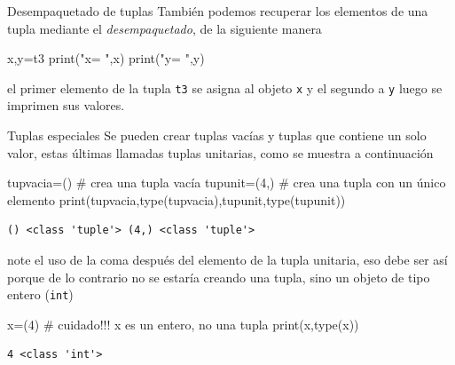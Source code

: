\documentclass[
  ignorenonframetext,
  aspectratio=169,
  spanish,
]{beamer}
\newenvironment{Shaded}{\begin{snugshade}}{\end{snugshade}}
\newcommand{\BuiltInTok}[1]{\textcolor[rgb]{0.00,0.23,0.31}{#1}}
\newcommand{\CommentTok}[1]{\textcolor[rgb]{0.37,0.37,0.37}{#1}}
\newcommand{\DecValTok}[1]{\textcolor[rgb]{0.68,0.00,0.00}{#1}}
\newcommand{\NormalTok}[1]{\textcolor[rgb]{0.00,0.23,0.31}{#1}}
\newcommand{\OperatorTok}[1]{\textcolor[rgb]{0.37,0.37,0.37}{#1}}
\newcommand{\StringTok}[1]{\textcolor[rgb]{0.13,0.47,0.30}{#1}}
\begin{document}
\begin{frame}[fragile]{Desempaquetado de tuplas}
\label{desempaquetado-de-tuplas}
También podemos recuperar los elementos de una tupla mediante el
\emph{desempaquetado}, de la siguiente
manera

\begin{Shaded}
\begin{Highlighting}[]
\NormalTok{x,y}\OperatorTok{=}\NormalTok{t3}
\BuiltInTok{print}\NormalTok{(}\StringTok{"x= "}\NormalTok{,x)}
\BuiltInTok{print}\NormalTok{(}\StringTok{"y= "}\NormalTok{,y)}
\end{Highlighting}
\end{Shaded}

el primer elemento de la tupla \texttt{t3} se asigna al objeto
\texttt{x} y el segundo a \texttt{y} luego se imprimen sus valores.
\end{frame}

\begin{frame}[fragile]{Tuplas especiales}
\label{tuplas-especiales}
Se pueden crear tuplas vacías y tuplas que contiene un solo valor, estas
últimas llamadas tuplas unitarias, como se muestra a continuación

\begin{Shaded}
\begin{Highlighting}[]
\NormalTok{tupvacia}\OperatorTok{=}\NormalTok{() }\CommentTok{\# crea una tupla vacía }
\NormalTok{tupunit}\OperatorTok{=}\NormalTok{(}\DecValTok{4}\NormalTok{,) }\CommentTok{\# crea una tupla con un único elemento }
\BuiltInTok{print}\NormalTok{(tupvacia,}\BuiltInTok{type}\NormalTok{(tupvacia),tupunit,}\BuiltInTok{type}\NormalTok{(tupunit))}
\end{Highlighting}
\end{Shaded}

\begin{verbatim}
() <class 'tuple'> (4,) <class 'tuple'>
\end{verbatim}

note el uso de la coma después del elemento de la tupla unitaria, eso
debe ser así porque de lo contrario no se estaría creando una tupla,
sino un objeto de tipo entero (\texttt{int})

\begin{Shaded}
\begin{Highlighting}[]
\NormalTok{x}\OperatorTok{=}\NormalTok{(}\DecValTok{4}\NormalTok{) }\CommentTok{\# cuidado!!! x es un entero, no una tupla  }
\BuiltInTok{print}\NormalTok{(x,}\BuiltInTok{type}\NormalTok{(x))}
\end{Highlighting}
\end{Shaded}

\begin{verbatim}
4 <class 'int'>
\end{verbatim}
\end{frame}
\end{document}
